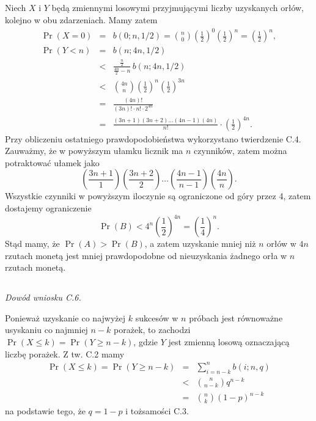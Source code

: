 \subsection{} %
Niech $X$ i $Y$ będą zmiennymi losowymi przyjmującymi liczby uzyskanych orłów, kolejno w obu zdarzeniach. Mamy zatem
\begin{eqnarray*}
	\Pr(X=0) &=& b(0;n,1/2) = \binom{n}{0}\left(\frac{1}{2}\right)^0\left(\frac{1}{2}\right)^n = \left(\frac{1}{2}\right)^n, \\
	\Pr(Y<n) &=& b(n;4n,1/2) \\
	&<& \frac{\frac{n}{2}}{\frac{4n}{2}-n}\,b(n;4n,1/2) \\
	&<& \binom{4n}{n}\left(\frac{1}{2}\right)^n\left(\frac{1}{2}\right)^{3n} \\
	&=& \frac{(4n)!}{(3n)!\cdot n!\cdot 2^{4n}} \\
	&=& \frac{(3n+1)(3n+2)\ldots(4n-1)(4n)}{n!}\cdot\left(\frac{1}{2}\right)^{4n}.
\end{eqnarray*}
Przy obliczeniu ostatniego prawdopodobieństwa wykorzystano twierdzenie C.4. Zauważmy, że w powyższym ułamku licznik ma $n$ czynników, zatem można potraktować ułamek jako
\[
	\left(\frac{3n+1}{1}\right)\left(\frac{3n+2}{2}\right)\ldots\left(\frac{4n-1}{n-1}\right)\left(\frac{4n}{n}\right).
\]
Wszystkie czynniki w powyższym iloczynie są ograniczone od góry przez 4, zatem dostajemy ograniczenie
\[
	\Pr(B) < 4^n\left(\frac{1}{2}\right)^{4n} = \left(\frac{1}{4}\right)^n.
\]
Stąd mamy, że $\Pr(A)>\Pr(B)$, a zatem uzyskanie mniej niż $n$ orłów w $4n$ rzutach monetą jest mniej prawdopodobne od nieuzyskania żadnego orła w $n$ rzutach monetą.

\subsection{} %
\noindent\emph{Dowód wniosku C.6.}

\noindent Ponieważ uzyskanie co najwyżej $k$ sukcesów w $n$ próbach jest równoważne usyskaniu co najmniej $n-k$ porażek, to zachodzi $\Pr(X\le k)=\Pr(Y\ge n-k)$, gdzie $Y$ jest zmienną losową oznaczającą liczbę porażek. Z tw. C.2 mamy
\begin{eqnarray*}
	\Pr(X\le k) = \Pr(Y\ge n-k) &=& \sum_{i=n-k}^nb(i;n,q) \\
	&<& \binom{n}{n-k}q^{n-k} \\
	&=& \binom{n}{k}(1-p)^{n-k}
\end{eqnarray*}
na podstawie tego, że $q=1-p$ i tożsamości C.3.\\

